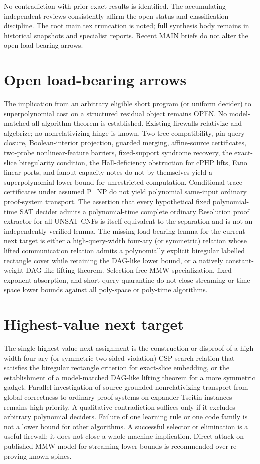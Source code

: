 \documentclass[11pt]{article}
\begin{document}
No contradiction with prior exact results is identified. The accumulating independent reviews consistently affirm the open status and classification discipline. The root main.tex truncation is noted; full synthesis body remains in historical snapshots and specialist reports. Recent MAIN briefs do not alter the open load-bearing arrows.

\section{Open load-bearing arrows}
The implication from an arbitrary eligible short program (or uniform decider) to superpolynomial cost on a structured residual object remains OPEN. No model-matched all-algorithm theorem is established. Existing firewalls relativize and algebrize; no nonrelativizing hinge is known. Two-tree compatibility, pin-query closure, Boolean-interior projection, guarded merging, affine-source certificates, two-probe nonlinear-feature barriers, fixed-support syndrome recovery, the exact-slice biregularity condition, the Hall-deficiency obstruction for cPHP lifts, Fano linear ports, and fanout capacity notes do not by themselves yield a superpolynomial lower bound for unrestricted computation. Conditional trace certificates under assumed P=NP do not yield polynomial same-input ordinary proof-system transport. The assertion that every hypothetical fixed polynomial-time SAT decider admits a polynomial-time complete ordinary Resolution proof extractor for all UNSAT CNFs is itself equivalent to the separation and is not an independently verified lemma. The missing load-bearing lemma for the current next target is either a high-query-width four-ary (or symmetric) relation whose lifted communication relation admits a polynomially explicit biregular labelled rectangle cover while retaining the DAG-like lower bound, or a natively constant-weight DAG-like lifting theorem. Selection-free MMW specialization, fixed-exponent absorption, and short-query quarantine do not close streaming or time-space lower bounds against all poly-space or poly-time algorithms.

\section{Highest-value next target}
The single highest-value next assignment is the construction or disproof of a high-width four-ary (or symmetric two-sided violation) CSP search relation that satisfies the biregular rectangle criterion for exact-slice embedding, or the establishment of a model-matched DAG-like lifting theorem for a more symmetric gadget. Parallel investigation of source-grounded nonrelativizing transport from global correctness to ordinary proof systems on expander-Tseitin instances remains high priority. A qualitative contradiction suffices only if it excludes arbitrary polynomial deciders. Failure of one learning rule or one code family is not a lower bound for other algorithms. A successful selector or elimination is a useful firewall; it does not close a whole-machine implication. Direct attack on published MMW model for streaming lower bounds is recommended over re-proving known spines.
\end{document}
